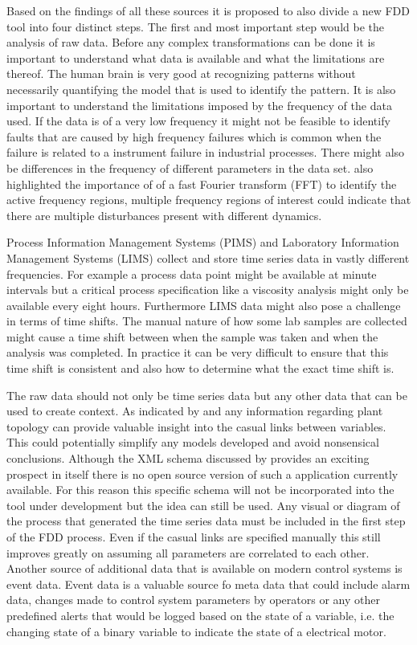 Based on the findings of all these sources it is proposed to also divide a new FDD tool into four distinct steps. The first and most important step would be the analysis of raw data. Before any complex transformations can be done it is important to understand what data is available and what the limitations are thereof. The human brain is very good at recognizing patterns without necessarily quantifying the model that is used to identify the pattern. It is also important to understand the limitations imposed by the frequency of the data used. If the data is of a very low frequency it might not be feasible to identify faults that are caused by high frequency failures which is common when the failure is related to a instrument failure in industrial processes. There might also be differences in the frequency of different parameters in the data set. \cite{streicher2019plant} also highlighted the importance of of a fast Fourier transform (FFT) to identify the active frequency regions, multiple frequency regions of interest could indicate that there are multiple disturbances present with different dynamics.

Process Information Management Systems (PIMS) and Laboratory Information Management Systems (LIMS) collect and store time series data in vastly different frequencies. For example a process data point might be available at minute intervals but a critical process specification like a viscosity analysis might only be available every eight hours. Furthermore LIMS data might also pose a challenge in terms of time shifts. The manual nature of how some lab samples are collected might cause a time shift between when the sample was taken and when the analysis was completed. In practice it can be very difficult to ensure that this time shift is consistent and also how to determine what the exact time shift is.

The raw data should not only be time series data but any other data that can be used to create context. As indicated by \cite{thornhill2007advances} and \cite{yim2006using} any information regarding plant topology can provide valuable insight into the casual links between variables. This could potentially simplify any models developed and avoid nonsensical conclusions. Although the XML schema discussed by  \cite{thornhill2007advances} provides an exciting prospect in itself there is no open source version of such a application currently available. For this reason this specific schema will not be incorporated into the tool under development but the idea can still be used. Any visual or diagram of the process that generated the time series data must be included in the first step of the FDD process. Even if the casual links are specified manually this still improves greatly on assuming all parameters are correlated to each other. Another source of additional data that is available on modern control systems is event data. Event data is a valuable source fo meta data that could include alarm data, changes made to control system parameters by operators or any other predefined alerts that would be logged based on the state of a variable, i.e. the changing state of a binary variable to indicate the state of a electrical motor.

